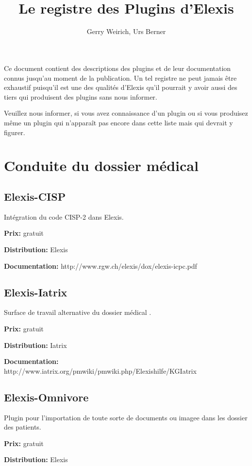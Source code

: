\documentclass[paper=a4,BCOR8.25mm]{scrartcl}
\author{Gerry Weirich, Urs Berner}
\title{ \textsuperscript{\textregistered}Le registre des Plugins d'Elexis}
\begin{document}
\maketitle

\tableofcontents


Ce document contient des descriptions des plugins  et de leur documentation connus jusqu'au moment de la publication. Un tel registre ne peut jamais être exhaustif puisqu'il est une des qualités d'Elexis qu'il pourrait y avoir aussi des tiers qui produisent des plugins sans nous informer.

\medskip

Veuillez nous informer, si vous avez connaissance d'un plugin ou si vous produisez même un plugin qui n'apparaît pas encore dans cette liste mais qui devrait y figurer. 



\section{Conduite du dossier médical}
\subsection{Elexis-CISP}
Intégration du code CISP-2 dans Elexis.

\medskip

\textbf{Prix:} gratuit

\textbf{Distribution:} Elexis

\textbf{Documentation:} http://www.rgw.ch/elexis/dox/elexis-icpc.pdf\

\subsection{Elexis-Iatrix}
Surface de travail alternative du dossier médical .

\textbf{Prix:} gratuit

\textbf{Distribution:} Iatrix

\textbf{Documentation:} http://www.iatrix.org/pmwiki/pmwiki.php/Elexishilfe/KGIatrix

\subsection{Elexis-Omnivore}
Plugin pour l'importation de toute sorte de documents ou imagee dans les dossier des patients.

\textbf{Prix:} gratuit

\textbf{Distribution:} Elexis
\end{document}
